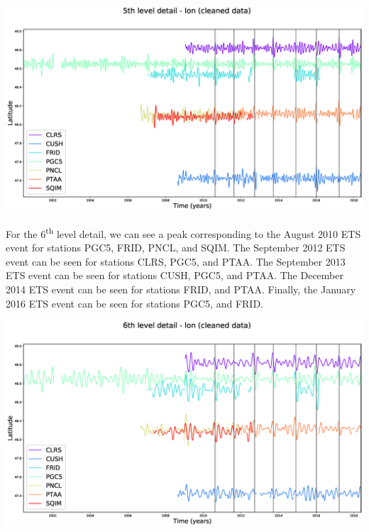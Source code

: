 \documentclass[main.tex]{subfiles}
\begin{document}
\begin{center}
\includegraphics[width=500pt]{Figures/slowslip_results/Figure_5.eps}
\captionsetup{type=figure}
\end{center}

For the 6\textsuperscript{th} level detail, we can see a peak corresponding to the August 2010 ETS event for stations PGC5, FRID, PNCL, and SQIM. The September 2012 ETS event can be seen for stations CLRS, PGC5, and PTAA. The September 2013 ETS event can be seen for stations CUSH, PGC5, and PTAA. The December 2014 ETS event can be seen for stations FRID, and PTAA. Finally, the January 2016 ETS event can be seen for stations PGC5, and FRID.

\begin{center}
\includegraphics[width=500pt]{Figures/slowslip_results/Figure_6.eps}
\captionsetup{type=figure}
\end{center}
\end{document}
